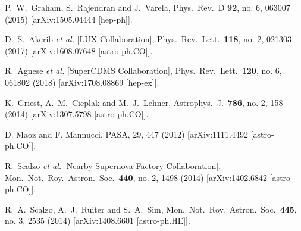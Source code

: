   P.~W.~Graham, S.~Rajendran and J.~Varela,
  Phys.\ Rev.\ D {\bf 92}, no. 6, 063007 (2015)
  [arXiv:1505.04444 [hep-ph]].


  D.~S.~Akerib {\it et al.} [LUX Collaboration],
  Phys.\ Rev.\ Lett.\  {\bf 118}, no. 2, 021303 (2017)
  [arXiv:1608.07648 [astro-ph.CO]].


  R.~Agnese {\it et al.} [SuperCDMS Collaboration],
  Phys.\ Rev.\ Lett.\  {\bf 120}, no. 6, 061802 (2018)
  [arXiv:1708.08869 [hep-ex]].


  K.~Griest, A.~M.~Cieplak and M.~J.~Lehner,
  Astrophys.\ J.\  {\bf 786}, no. 2, 158 (2014)
  [arXiv:1307.5798 [astro-ph.CO]].


  D. Maoz and F. Mannucci,
  PASA, 29, 447 (2012)
  [arXiv:1111.4492 [astro-ph.CO]].


  R.~Scalzo {\it et al.} [Nearby Supernova Factory Collaboration],
  Mon.\ Not.\ Roy.\ Astron.\ Soc.\  {\bf 440}, no. 2, 1498 (2014)
  [arXiv:1402.6842 [astro-ph.CO]].


  R.~A.~Scalzo, A.~J.~Ruiter and S.~A.~Sim,
  Mon.\ Not.\ Roy.\ Astron.\ Soc.\  {\bf 445}, no. 3, 2535 (2014)
  [arXiv:1408.6601 [astro-ph.HE]].


